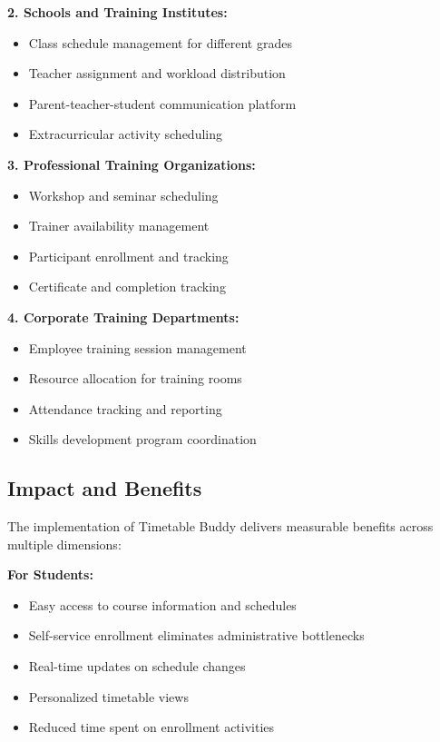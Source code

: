 \textbf{2. Schools and Training Institutes:}
\begin{itemize}
    \item Class schedule management for different grades
    \item Teacher assignment and workload distribution
    \item Parent-teacher-student communication platform
    \item Extracurricular activity scheduling
\end{itemize}

\textbf{3. Professional Training Organizations:}
\begin{itemize}
    \item Workshop and seminar scheduling
    \item Trainer availability management
    \item Participant enrollment and tracking
    \item Certificate and completion tracking
\end{itemize}

\textbf{4. Corporate Training Departments:}
\begin{itemize}
    \item Employee training session management
    \item Resource allocation for training rooms
    \item Attendance tracking and reporting
    \item Skills development program coordination
\end{itemize}

\subsection{Impact and Benefits}

The implementation of Timetable Buddy delivers measurable benefits across multiple dimensions:

\textbf{For Students:}
\begin{itemize}
    \item Easy access to course information and schedules
    \item Self-service enrollment eliminates administrative bottlenecks
    \item Real-time updates on schedule changes
    \item Personalized timetable views
    \item Reduced time spent on enrollment activities
\end{itemize}

